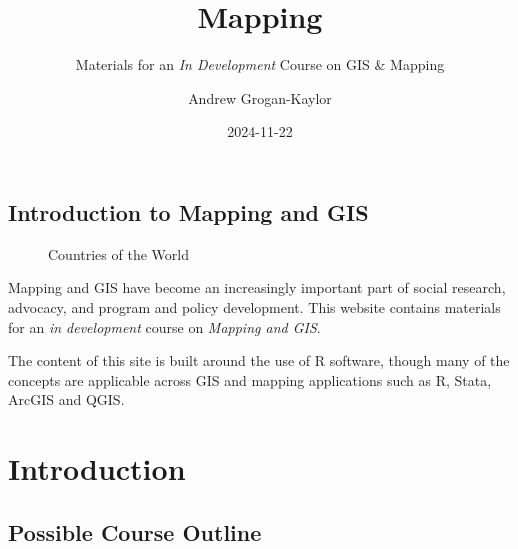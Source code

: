 \documentclass[
  letterpaper,
  DIV=11,
  numbers=noendperiod,
  oneside]{scrreprt}
\title{Mapping}
\subtitle{Materials for an \emph{In Development} Course on GIS \&
Mapping}
\author{Andrew Grogan-Kaylor}
\date{2024-11-22}
\renewcommand*\contentsname{Table of contents}
\newcommand\contentsname{Table of contents}
\begin{document}
\maketitle

\renewcommand*\contentsname{Table of contents}
{
\hypersetup{linkcolor=}
\setcounter{tocdepth}{2}
\tableofcontents
}
\listoffigures
\listoftables
\chapter{Introduction to Mapping and
GIS}\label{introduction-to-mapping-and-gis}

\begin{figure}


\caption{\label{fig-world}Countries of the World}

\end{figure}%

Mapping and GIS have become an increasingly important part of social
research, advocacy, and program and policy development. This website
contains materials for an \emph{in development} course on \emph{Mapping
and GIS}.

The content of this site is built around the use of R software, though
many of the concepts are applicable across GIS and mapping applications
such as R, Stata, ArcGIS and QGIS.

\part{Introduction}

\chapter{Possible Course Outline}\label{possible-course-outline}
\end{document}
